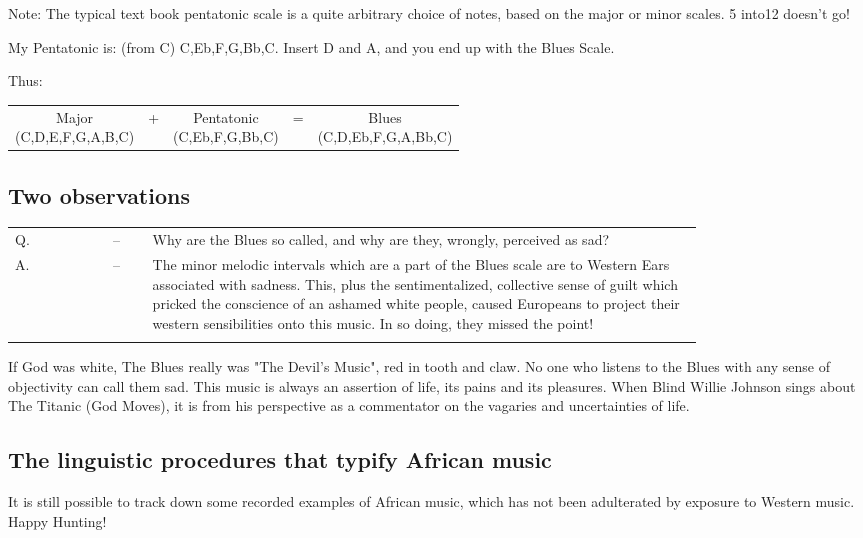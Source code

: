 \documentclass{article}
\begin{document}
Note: The typical text book pentatonic scale is a quite arbitrary choice of notes, based on the major or minor scales.
5 into12 doesn't go!

My Pentatonic is: (from C) C,Eb,F,G,Bb,C.
Insert D and A, and you end up with the Blues Scale.

Thus:

\begin{tabular}{ccccc}
    \makecell{Major\\(C,D,E,F,G,A,B,C)} & + & \makecell{Pentatonic\\(C,Eb,F,G,Bb,C)} & = & \makecell{Blues\\(C,D,Eb,F,G,A,Bb,C)}
\end{tabular}

\subsection{Two observations}

\begin{tabular}{lcp{0.8\linewidth}}
    Q. & -- & Why are the Blues so called, and why are they, wrongly, perceived as sad?\\
    A. & -- & The minor melodic intervals which are a part of the Blues scale are to Western Ears associated with sadness. This, plus the sentimentalized, collective sense of guilt which pricked the conscience of an ashamed white people, caused Europeans to project their western sensibilities onto this music. In so doing, they missed the point!\\\\
\end{tabular}

If God was white, The Blues really was "The Devil's Music", red in tooth and claw.
No one who listens to the Blues with any sense of objectivity can call them sad.
This music is always an assertion of life, its pains and its pleasures.
When Blind Willie Johnson sings about The Titanic (God Moves), it is from his perspective as a commentator on the vagaries and uncertainties of life.



\subsection{The linguistic procedures that typify African music}

It is still possible to track down some recorded examples of African music, which has not been adulterated by exposure to Western music.
Happy Hunting!
\end{document}
